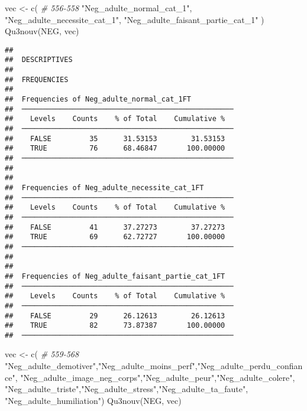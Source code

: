 \documentclass[
]{article}
\newenvironment{Shaded}{\begin{snugshade}}{\end{snugshade}}
\newcommand{\CommentTok}[1]{\textcolor[rgb]{0.56,0.35,0.01}{\textit{#1}}}
\newcommand{\FunctionTok}[1]{\textcolor[rgb]{0.00,0.00,0.00}{#1}}
\newcommand{\NormalTok}[1]{#1}
\newcommand{\OtherTok}[1]{\textcolor[rgb]{0.56,0.35,0.01}{#1}}
\newcommand{\StringTok}[1]{\textcolor[rgb]{0.31,0.60,0.02}{#1}}
\begin{document}
\begin{Shaded}
\begin{Highlighting}[]
\NormalTok{vec }\OtherTok{\textless{}{-}} \FunctionTok{c}\NormalTok{(   }\CommentTok{\# 556{-}558}
  \StringTok{"Neg\_adulte\_normal\_cat\_1"}\NormalTok{,}
  \StringTok{"Neg\_adulte\_necessite\_cat\_1"}\NormalTok{,}
  \StringTok{"Neg\_adulte\_faisant\_partie\_cat\_1"}\NormalTok{ )}
\FunctionTok{Qu3nouv}\NormalTok{(NEG, vec)}
\end{Highlighting}
\end{Shaded}

\begin{verbatim}
## 
##  DESCRIPTIVES
## 
##  FREQUENCIES
## 
##  Frequencies of Neg_adulte_normal_cat_1FT           
##  ────────────────────────────────────────────────── 
##    Levels    Counts    % of Total    Cumulative %   
##  ────────────────────────────────────────────────── 
##    FALSE         35      31.53153        31.53153   
##    TRUE          76      68.46847       100.00000   
##  ────────────────────────────────────────────────── 
## 
## 
##  Frequencies of Neg_adulte_necessite_cat_1FT        
##  ────────────────────────────────────────────────── 
##    Levels    Counts    % of Total    Cumulative %   
##  ────────────────────────────────────────────────── 
##    FALSE         41      37.27273        37.27273   
##    TRUE          69      62.72727       100.00000   
##  ────────────────────────────────────────────────── 
## 
## 
##  Frequencies of Neg_adulte_faisant_partie_cat_1FT   
##  ────────────────────────────────────────────────── 
##    Levels    Counts    % of Total    Cumulative %   
##  ────────────────────────────────────────────────── 
##    FALSE         29      26.12613        26.12613   
##    TRUE          82      73.87387       100.00000   
##  ──────────────────────────────────────────────────
\end{verbatim}

\begin{Shaded}
\begin{Highlighting}[]
\NormalTok{vec }\OtherTok{\textless{}{-}} \FunctionTok{c}\NormalTok{(   }\CommentTok{\# 559{-}568}
  \StringTok{"Neg\_adulte\_demotiver"}\NormalTok{,}\StringTok{"Neg\_adulte\_moins\_perf"}\NormalTok{,}\StringTok{"Neg\_adulte\_perdu\_confiance"}\NormalTok{,}
  \StringTok{"Neg\_adulte\_image\_neg\_corps"}\NormalTok{,}\StringTok{"Neg\_adulte\_peur"}\NormalTok{,}\StringTok{"Neg\_adulte\_colere"}\NormalTok{,}
  \StringTok{"Neg\_adulte\_triste"}\NormalTok{,}\StringTok{"Neg\_adulte\_stress"}\NormalTok{,}\StringTok{"Neg\_adulte\_ta\_faute"}\NormalTok{,}
  \StringTok{"Neg\_adulte\_humiliation"}\NormalTok{)}
\FunctionTok{Qu3nouv}\NormalTok{(NEG, vec)}
\end{Highlighting}
\end{Shaded}
\end{document}
